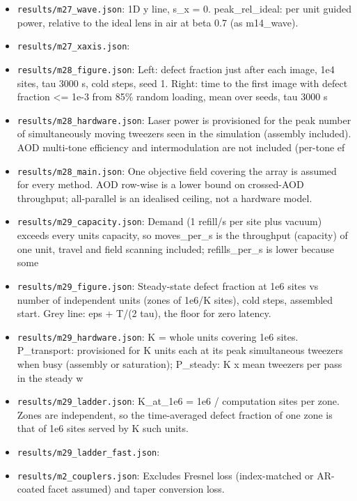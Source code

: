 \begin{itemize}
  difference between the 2D effective-index lens map (used by the wave
  model) and the 3D trace.
\item
  \texttt{results/m27\_wave.json}: 1D y line, s\_x = 0.
  peak\_rel\_ideal: per unit guided power, relative to the ideal lens in
  air at beta 0.7 (as m14\_wave).
\item
  \texttt{results/m27\_xaxis.json}:
\item
  \texttt{results/m28\_figure.json}: Left: defect fraction just after
  each image, 1e4 sites, tau 3000 s, cold steps, seed 1. Right: time to
  the first image with defect fraction \textless= 1e-3 from 85\% random
  loading, mean over seeds, tau 3000 s
\item
  \texttt{results/m28\_hardware.json}: Laser power is provisioned for
  the peak number of simultaneously moving tweezers seen in the
  simulation (assembly included). AOD multi-tone efficiency and
  intermodulation are not included (per-tone ef
\item
  \texttt{results/m28\_main.json}: One objective field covering the
  array is assumed for every method. AOD row-wise is a lower bound on
  crossed-AOD throughput; all-parallel is an idealised ceiling, not a
  hardware model.
\item
  \texttt{results/m29\_capacity.json}: Demand (1 refill/s per site plus
  vacuum) exceeds every unit\textquotesingle s capacity, so
  moves\_per\_s is the throughput (capacity) of one unit, travel and
  field scanning included; refills\_per\_s is lower because some
\item
  \texttt{results/m29\_figure.json}: Steady-state defect fraction at 1e6
  sites vs number of independent units (zones of 1e6/K sites), cold
  steps, assembled start. Grey line: eps + T/(2 tau), the floor for zero
  latency.
\item
  \texttt{results/m29\_hardware.json}: K = whole units covering 1e6
  sites. P\_transport: provisioned for K units each at its peak
  simultaneous tweezers when busy (assembly or saturation); P\_steady: K
  x mean tweezers per pass in the steady w
\item
  \texttt{results/m29\_ladder.json}: K\_at\_1e6 = 1e6 / computation
  sites per zone. Zones are independent, so the time-averaged defect
  fraction of one zone is that of 1e6 sites served by K such units.
\item
  \texttt{results/m29\_ladder\_fast.json}:
\item
  \texttt{results/m2\_couplers.json}: Excludes Fresnel loss
  (index-matched or AR-coated facet assumed) and taper conversion loss.

\end{itemize}
